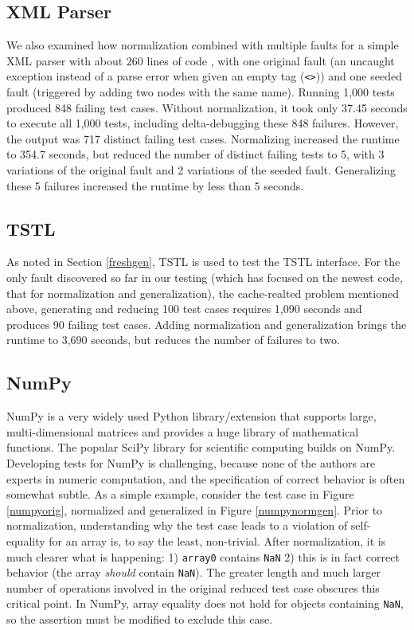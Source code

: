 \subsection{XML Parser}

We also examined how normalization combined with multiple faults for a
simple XML parser with about 260 lines of code \cite{myxml}, with one
original fault (an uncaught exception instead of a parse error when given an empty
tag ({\tt <>})) and one seeded fault (triggered by adding two nodes
with the same name).  Running 1,000 tests produced 848 failing test
cases.  Without normalization, it took only 37.45 seconds to execute
all 1,000 tests, including delta-debugging these 848 failures.
However, the output was 717 distinct failing test cases.  Normalizing
increased the runtime to 354.7 seconds, but reduced the number of
distinct failing tests to 5, with 3 variations of the original fault
and 2 variations of the seeded fault.  Generalizing these 5 failures
increased the runtime by less than 5 seconds.

\subsection{TSTL}

As noted in Section \ref{freshgen}, TSTL is used to test the TSTL
interface.  For the only fault discovered so far in our testing (which
has focused on the newest code, that for normalization and
generalization), the cache-realted problem mentioned above, generating
and reducing 100 test cases requires 1,090 seconds and produces 90
failing test cases.  Adding normalization and generalization brings
the runtime to 3,690 seconds, but reduces the number of failures to two.

\subsection{NumPy}

NumPy \cite{NumPy} is a very widely used Python library/extension that supports
large, multi-dimensional matrices and provides a huge library of
mathematical functions.  The popular SciPy library for scientific
computing builds on NumPy.  Developing tests for NumPy is challenging,
because none of the authors are experts in numeric computation, and
the specification of correct behavior is often somewhat subtle.  As a
simple example, consider the test case in Figure \ref{numpyorig},
normalized and generalized in Figure \ref{numpynormgen}.  Prior to
normalization, understanding why the test case leads to a violation of
self-equality for an array is, to say the least, non-trivial.  After
normalization, it is much clearer what is happening:
1) {\tt array0} contains {\tt NaN} 2) this is in fact correct
behavior (the array \emph{should} contain {\tt NaN}).  The greater
length and much larger number of operations involved in the original
reduced test case obscures this critical point.  In NumPy, array
equality does not hold for objects containing {\tt NaN}, so the
assertion must be modified to exclude this case.

